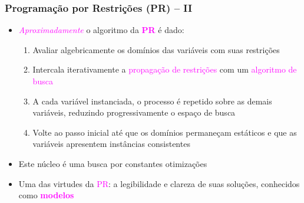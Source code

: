 \begin{frame}[fragile]

    \frametitle{Programação por Restrições (PR) -- II}

   \begin{block}{}
     \begin{itemize}

      \item \textcolor{magenta}{\textit{Aproximadamente}} o algoritmo da \textbf{\textcolor{magenta}{PR}} é dado:
       \pause       
          \begin{enumerate}

            \item Avaliar algebricamente  os domínios das variáveis com suas restrições

            \item Intercala iterativamente a \textcolor{magenta}{\textsf{propagação de restrições}} com 
                  um \textcolor{magenta}{\textsf{algoritmo de busca}}

            \item A cada variável instanciada, o processo é repetido sobre as demais variáveis, 
            reduzindo progressivamente o espaço de busca

            \item Volte ao passo inicial até que os domínios permaneçam estáticos
            e que as variáveis apresentem instâncias consistentes
              
          \end{enumerate}
       
        \pause
       \item Este núcleo é uma busca por constantes otimizações

        \pause
       \item Uma das virtudes da \textcolor{magenta}{PR}: 
       a legibilidade e clareza de suas soluções, conhecidos
       como \textcolor{magenta}{\textbf{modelos}}
       
    \end{itemize}
    
    \end{block}
    
\end{frame}


